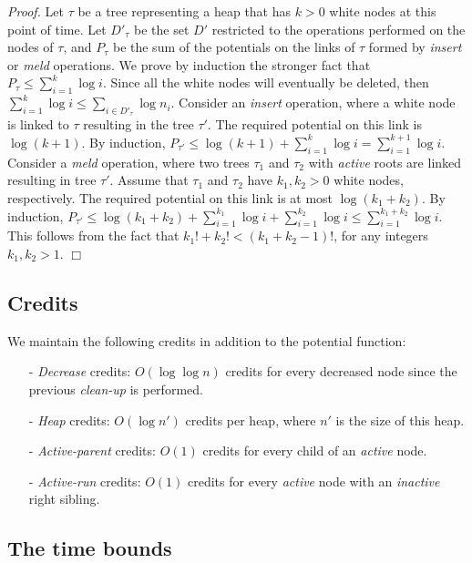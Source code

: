 {\it Proof.}
Let $\tau$ be a tree representing a heap that has $k>0$ white nodes at this point of time. Let $D'_{\tau}$ be the set $D'$ restricted to the operations performed on the nodes of $\tau$, and $P_{\tau}$ be the sum of the potentials on the links of $\tau$ formed by {\it insert} or {\it meld} operations. We prove by induction the stronger fact that $P_{\tau} \leq \sum_{i=1}^k \log{i}$. Since all the white nodes will eventually be deleted, then $\sum_{i=1}^k \log{i} \leq \sum_{i \in D'_{\tau}} \log{n_i}$.
Consider an {\it insert} operation, where a white node is linked to $\tau$ resulting in the tree $\tau'$. The required potential on this link is $\log{(k+1)}$. By induction, $P_{\tau'} \leq \log{(k+1)} + \sum_{i=1}^k \log{i} =  \sum_{i=1}^{k+1} \log{i}$. 
Consider a {\it meld} operation, where two trees $\tau_1$ and $\tau_2$ with {\it active} roots are linked resulting in tree $\tau'$. Assume that $\tau_1$ and $\tau_2$ have $k_1, k_2 > 0$ white nodes, respectively. The required potential on this link is at most $\log{(k_1+k_2)}$. By induction, $P_{\tau'} \leq \log{(k_1+k_2)} + \sum_{i=1}^{k_1} \log{i} + \sum_{i=1}^{k_2} \log{i} \leq \sum_{i=1}^{k_1+k_2} \log{i}$. This follows from the fact that $k_1! + k_2! < (k_1 + k_2 - 1)!$, for any integers $k_1, k_2 > 1$. 
\hfill $\Box$

\subsection{Credits}

We maintain the following credits in addition to the potential function:

\begin{enumerate}
\item [-] {\it Decrease} credits: $O(\log \log n)$ credits for every decreased node since the previous {\it clean-up} is performed. 
\item [-] {\it Heap} credits: $O(\log{n'})$ credits per heap, where $n'$ is the size of this heap.
\item [-] {\it Active-parent} credits: $O(1)$ credits for every child of an {\it active} node.
\item [-] {\it Active-run} credits: $O(1)$ credits for every {\it active} node with an {\it inactive} right sibling. 
\end{enumerate}

\subsection{The time bounds}

